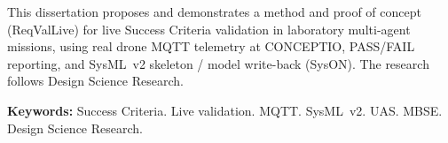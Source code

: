 This dissertation proposes and demonstrates a method and proof of concept
(ReqValLive) for live Success Criteria validation in laboratory multi-agent missions,
using real drone MQTT telemetry at CONCEPTIO, PASS/FAIL reporting, and SysML~v2
skeleton / model write-back (SysON). The research follows Design Science Research.

\vspace{0.8em}
\noindent\textbf{Keywords:} Success Criteria. Live validation. MQTT. SysML~v2. UAS. MBSE.
Design Science Research.
